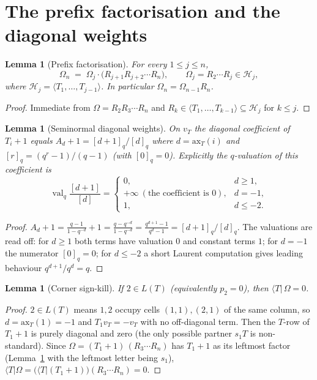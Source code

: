 \documentclass[11pt]{article}
\newtheorem{lemma}[theorem]{Lemma}
\theoremstyle{definition}
\newcommand{\Om}{\Omega}
\newcommand{\HH}{\mathcal{H}}
\DeclareMathOperator{\val}{val}
\begin{document}
\section{The prefix factorisation and the diagonal weights}

\begin{lemma}[Prefix factorisation]\label{lem:prefix}
For every $1\le j\le n$,
\[
  \Om_n \;=\; \Om_j\cdot\bigl(R_{j+1}R_{j+2}\cdots R_n\bigr),
  \qquad \Om_j=R_2\cdots R_j\in\HH_j,
\]
where $\HH_j=\langle T_1,\dots,T_{j-1}\rangle$. In particular $\Om_n=\Om_{n-1}R_n$.
\end{lemma}
\begin{proof}
Immediate from $\Om=R_2R_3\cdots R_n$ and $R_k\in\langle T_1,\dots,T_{k-1}\rangle\subseteq\HH_j$
for $k\le j$.
\end{proof}

\begin{lemma}[Seminormal diagonal weights]\label{lem:weights}
On $v_T$ the diagonal coefficient of $T_i+1$ equals $A_d+1=[d+1]_q/[d]_q$ where
$d=\mathrm{ax}_T(i)$ and $[r]_q=(q^r-1)/(q-1)$ (with $[0]_q=0$). Explicitly the
$q$-valuation of this coefficient is
\[
  \val_q\frac{[d+1]}{[d]}=
  \begin{cases}
    0, & d\ge 1,\\
    +\infty\ (\text{the coefficient is }0), & d=-1,\\
    1, & d\le -2.
  \end{cases}
\]
\end{lemma}
\begin{proof}
$A_d+1=\frac{q-1}{1-q^{-d}}+1=\frac{q-q^{-d}}{1-q^{-d}}=\frac{q^{d+1}-1}{q^{d}-1}
=[d+1]_q/[d]_q$. The valuations are read off: for $d\ge 1$ both terms have valuation $0$ and
constant terms $1$; for $d=-1$ the numerator $[0]_q=0$; for $d\le -2$ a short Laurent
computation gives leading behaviour $q^{d+1}/q^{d}=q$.
\end{proof}

\begin{lemma}[Corner sign-kill]\label{lem:corner}
If $2\in L(T)$ (equivalently $p_2=0$), then $\langle T|\,\Om=0$.
\end{lemma}
\begin{proof}
$2\in L(T)$ means $1,2$ occupy cells $(1,1),(2,1)$ of the same column, so $d=\mathrm{ax}_T(1)=-1$
and $T_1v_T=-v_T$ with no off-diagonal term. Then the $T$-row of $T_1+1$ is purely diagonal and
zero (the only possible partner $s_1T$ is non-standard). Since $\Om=(T_1+1)\,(R_3\cdots R_n)$ has
$T_1+1$ as its leftmost factor (Lemma~\ref{lem:prefix} with the leftmost letter being $s_1$),
$\langle T|\Om=\bigl(\langle T|(T_1+1)\bigr)(R_3\cdots R_n)=0$.
\end{proof}
\end{document}
